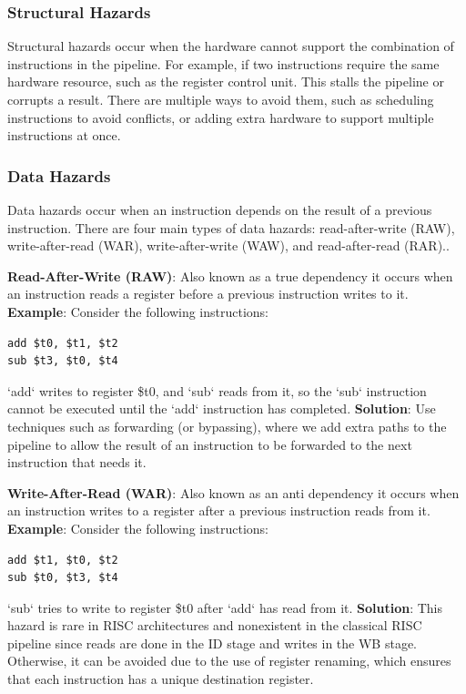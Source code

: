 \subsubsection {Structural Hazards}\label{sec:structural_hazards}
Structural hazards occur when the hardware cannot support the combination of instructions in the pipeline. For example, if two instructions require the same hardware resource, such as the register control unit.
This stalls the pipeline or corrupts a result.
There are multiple ways to avoid them, such as scheduling instructions to avoid conflicts, or adding extra hardware to support multiple instructions at once\cite{proebsting1994detecting}.
\subsubsection {Data Hazards}\label{sec:data_hazards}
Data hazards occur when an instruction depends on the result of a previous instruction. There are four main types of data hazards: read-after-write (RAW), write-after-read (WAR), write-after-write (WAW), and read-after-read (RAR).\cite{kiat2017comprehensive}.

\textbf{Read-After-Write (RAW)}: Also known as a true dependency it occurs when an instruction reads a register before a previous instruction writes to it.\newline
\textbf{Example}: Consider the following instructions:
\begin{verbatim}
add $t0, $t1, $t2
sub $t3, $t0, $t4   
\end{verbatim}
`add` writes to register \$t0, and `sub` reads from it, so the `sub` instruction cannot be executed until the `add` instruction has completed.\newline
\textbf{Solution}: Use techniques such as forwarding (or bypassing), where we add extra paths to the pipeline to allow the result of an instruction to be forwarded to the next instruction that needs it.

\textbf{Write-After-Read (WAR)}: Also known as an anti dependency it occurs when an instruction writes to a register after a previous instruction reads from it.\newline
\textbf{Example}: Consider the following instructions:
\begin{verbatim}
add $t1, $t0, $t2
sub $t0, $t3, $t4
\end{verbatim}
`sub` tries to write to register \$t0 after `add` has read from it.
\textbf{Solution}: This hazard is rare in RISC architectures and nonexistent in the classical RISC pipeline since reads are done in the ID stage and writes in the WB stage. Otherwise, it can be avoided due to the use of register renaming, which ensures that each instruction has a unique destination register. 

